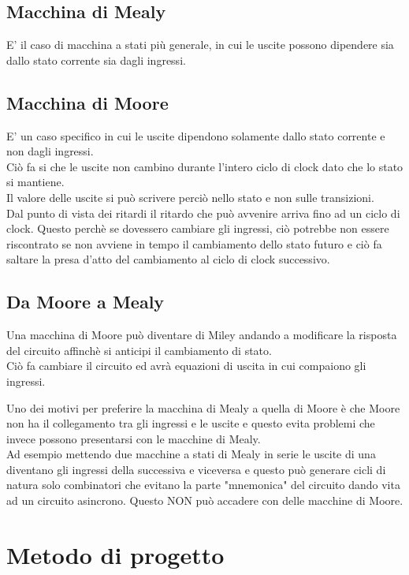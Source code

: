 \documentclass[a4paper]{book}
\begin{document}
\subsection*{Macchina di Mealy}

E' il caso di macchina a stati più generale, in cui le uscite possono dipendere sia dallo stato corrente sia dagli ingressi.

\subsection*{Macchina di Moore}
 
E' un caso specifico in cui le uscite dipendono solamente dallo stato corrente e non dagli ingressi.\\
Ciò fa si che le uscite non cambino durante l'intero ciclo di clock dato che lo stato si mantiene.\\
Il valore delle uscite si può scrivere perciò nello stato e non sulle transizioni.\\
Dal punto di vista dei ritardi il ritardo che può avvenire arriva fino ad un ciclo di clock.
Questo perchè se dovessero cambiare gli ingressi, ciò potrebbe non essere riscontrato se non avviene in tempo il cambiamento dello stato futuro e ciò fa saltare la presa d'atto del cambiamento al ciclo di clock successivo.\\

\subsection*{Da Moore a Mealy}

Una macchina di Moore può diventare di Miley andando a modificare la risposta del circuito affinchè si anticipi il cambiamento di stato.\\
Ciò fa cambiare il circuito ed avrà equazioni di uscita in cui compaiono gli ingressi.

Uno dei motivi per preferire la macchina di Mealy a quella di Moore è che Moore non ha il collegamento tra gli ingressi e le uscite e questo evita problemi che invece possono presentarsi con le macchine di Mealy.\\
Ad esempio mettendo due macchine a stati di Mealy in serie le uscite di una diventano gli ingressi della successiva e viceversa e questo può generare cicli di natura solo combinatori che evitano la parte "mnemonica" del circuito dando vita ad un circuito asincrono.
Questo NON può accadere con delle macchine di Moore.

\section{Metodo di progetto}
\end{document}
